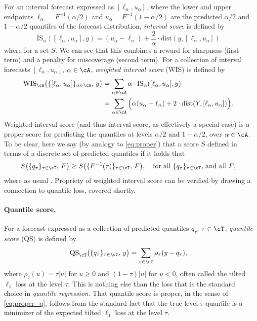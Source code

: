 \documentclass{article}
\begin{document}
For an interval forecast expressed as $[\ell_\alpha, u_\alpha]$, where the lower
and upper endpoints $\ell_\alpha = F^{-1}(\alpha/2)$ and $u_\alpha =
F^{-1}(1-\alpha/2)$ are the predicted $\alpha/2$ and $1-\alpha/2$ quantiles of
the forecast distribution, \emph{interval score} is defined by 
\[
\mathrm{IS}_\alpha( [\ell_\alpha, u_\alpha], y) = 
(u_\alpha - \ell_\alpha) + \frac{2}{\alpha} \cdot
\mathrm{dist}(y, [\ell_\alpha, u_\alpha])
\]
where  for a set $S$. We can
see that this combines a reward for sharpness (first term) and a penalty for 
miscoverage (second term). For a collection of interval forecasts
$[\ell_\alpha, u_\alpha]$, $\alpha \in \cA$, \emph{weighted interval score}
(WIS) is defined by
\begin{align}
\nonumber
\mathrm{WIS}_\cA \big( \{[\ell_\alpha, u_\alpha]\}_{\alpha \in \cA}, \, y \big)  
&= \sum_{\alpha \in \cA} \alpha \cdot \mathrm{IS}_\alpha( [\ell_\alpha,
  u_\alpha], y) \\
\label{eq:wis}
&=\sum_{\alpha \in \cA} \Big(\alpha (u_\alpha - \ell_\alpha) + 2 \cdot
  \mathrm{dist}(Y, [\ell_\alpha, u_\alpha]) \Big).
\end{align}
Weighted interval score (and thus interval score, as effectively a special case)
is a proper score for predicting the quantiles at levels $\alpha/2$ and
$1-\alpha/2$, over $\alpha \in \cA$. To be clear, here we say (by analogy to 
\eqref{eq:proper}) that a score $S$ defined in terms of a discrete set of
predicted quantiles  if it holds that   
\begin{equation}
\label{eq:proper_q}
S \big( \{q_\tau\}_{\tau \in \cT}, \, F \big) \geq S \big(
\{F^{-1}(\tau)\}_{\tau \in \cT}, \, F \big), \quad \text{for all
$\{q_\tau\}_{\tau \in \cT}$, and all $F$},    
\end{equation}
where as usual . Propriety of weighted interval score  
can be verified by drawing a connection to quantile loss, covered shortly.  

\paragraph{Quantile score.}

For a forecast expressed as a collection of predicted quantiles $q_\tau$, $\tau
\in \cT$, \emph{quantile score} (QS) is defined by 
\begin{equation}
\label{eq:qs}
\mathrm{QS}_\cT \big( \{q_\tau\}_{\tau \in \cT}, \, y \big) = 
\sum_{\tau \in \cT} \rho_\tau(y - q_\tau),
\end{equation}
where $\rho_\tau(u) = \tau |u|$ for $u \geq 0$ and $(1-\tau) |u|$ for $u < 0$,
often called the tilted $\ell_1$ loss at the level $\tau$. This is nothing else
than the loss that is the standard choice in \emph{quantile regression}. That
quantile score is proper, in the sense of \eqref{eq:proper_q}, follows from the
standard fact that the true level $\tau$ quantile is a minimizer of the expected
tilted $\ell_1$ loss at the level $\tau$.
\end{document}
